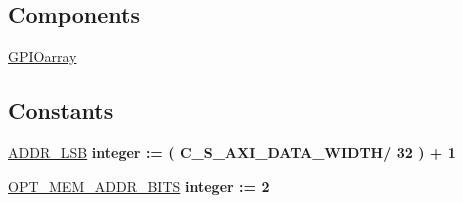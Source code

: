 \subsection*{Components}
 \begin{DoxyCompactItemize}
\item 
\hypertarget{classmy_g_p_i_o___a_x_i_1_1arch__imp_gad6a4d4ce60da2d6353c770df7ba07bd0}{\hyperlink{group___a_x_i-internal_gad6a4d4ce60da2d6353c770df7ba07bd0}{G\+P\+I\+Oarray}  {\bfseries }  }\label{classmy_g_p_i_o___a_x_i_1_1arch__imp_gad6a4d4ce60da2d6353c770df7ba07bd0}

\end{DoxyCompactItemize}
\subsection*{Constants}
 \begin{DoxyCompactItemize}
\item 
\hypertarget{classmy_g_p_i_o___a_x_i_1_1arch__imp_ga92f00d1b43f901f1bf5684d1e79aab84}{\hyperlink{group___a_x_i-internal_ga92f00d1b43f901f1bf5684d1e79aab84}{A\+D\+D\+R\+\_\+\+L\+S\+B} {\bfseries \textcolor{vhdlchar}{integer}\textcolor{vhdlchar}{ }\textcolor{vhdlchar}{ }\textcolor{vhdlchar}{\+:}\textcolor{vhdlchar}{=}\textcolor{vhdlchar}{ }\textcolor{vhdlchar}{(}\textcolor{vhdlchar}{ }\textcolor{vhdlchar}{ }\textcolor{vhdlchar}{ }\textcolor{vhdlchar}{ }\textcolor{vhdlchar}{C\+\_\+\+S\+\_\+\+A\+X\+I\+\_\+\+D\+A\+T\+A\+\_\+\+W\+I\+D\+T\+H}\textcolor{vhdlchar}{/}\textcolor{vhdlchar}{ } \textcolor{vhdldigit}{32} \textcolor{vhdlchar}{ }\textcolor{vhdlchar}{)}\textcolor{vhdlchar}{ }\textcolor{vhdlchar}{+}\textcolor{vhdlchar}{ } \textcolor{vhdldigit}{1} \textcolor{vhdlchar}{ }} }\label{classmy_g_p_i_o___a_x_i_1_1arch__imp_ga92f00d1b43f901f1bf5684d1e79aab84}

\item 
\hypertarget{classmy_g_p_i_o___a_x_i_1_1arch__imp_ga913a8d777fcc731ba920264a143ec91f}{\hyperlink{group___a_x_i-internal_ga913a8d777fcc731ba920264a143ec91f}{O\+P\+T\+\_\+\+M\+E\+M\+\_\+\+A\+D\+D\+R\+\_\+\+B\+I\+T\+S} {\bfseries \textcolor{vhdlchar}{integer}\textcolor{vhdlchar}{ }\textcolor{vhdlchar}{ }\textcolor{vhdlchar}{\+:}\textcolor{vhdlchar}{=}\textcolor{vhdlchar}{ }\textcolor{vhdlchar}{ } \textcolor{vhdldigit}{2} \textcolor{vhdlchar}{ }} }\label{classmy_g_p_i_o___a_x_i_1_1arch__imp_ga913a8d777fcc731ba920264a143ec91f}

\end{DoxyCompactItemize}
